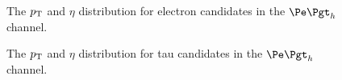\begin{figure}[htb]
\begin{center}

\end{center}
\caption{
The $p_{\mathrm{T}}$ and $\eta$ distribution for electron candidates in the $\etau$
channel.
}
\label{fig:etauelectrons}
\end{figure}


\begin{figure}[htb]
\begin{center}

\end{center}
\caption{
The $p_{\mathrm{T}}$ and $\eta$ distribution for tau candidates in the $\etau$
channel.
}
\label{fig:etautaus}
\end{figure}

